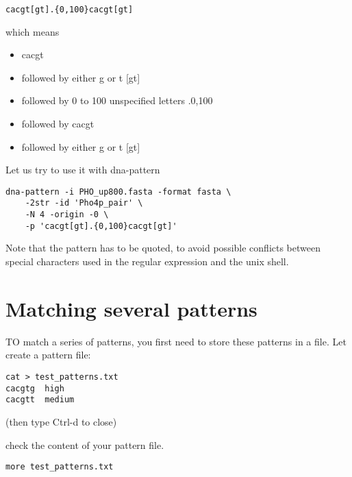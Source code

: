 {\color{Blue} \begin{footnotesize} 
\begin{verbatim}
cacgt[gt].{0,100}cacgt[gt]
\end{verbatim} \end{footnotesize}
}

which means
\begin{itemize}
\item cacgt 
\item followed by either g or t [gt]
\item followed by 0 to 100 unspecified letters .{0,100}
\item followed by cacgt
\item followed by either g or t [gt]
\end{itemize}

Let us try to use it with dna-pattern

{\color{Blue} \begin{footnotesize} 
\begin{verbatim}
dna-pattern -i PHO_up800.fasta -format fasta \
    -2str -id 'Pho4p_pair' \
    -N 4 -origin -0 \
    -p 'cacgt[gt].{0,100}cacgt[gt]'
\end{verbatim} \end{footnotesize}
}


Note that the pattern has to be quoted, to avoid possible conflicts
between special characters used in the regular expression and the unix
shell.


\section{Matching several patterns}

TO match a series of patterns, you first need to store these patterns
in a file. Let create a pattern file:

{\color{Blue} \begin{footnotesize} 
\begin{verbatim}
cat > test_patterns.txt
cacgtg	high
cacgtt	medium
\end{verbatim} \end{footnotesize}
}
(then type Ctrl-d to close)

check the content of your pattern file.
{\color{Blue} \begin{footnotesize} 
\begin{verbatim}
more test_patterns.txt
\end{verbatim} \end{footnotesize}
}

